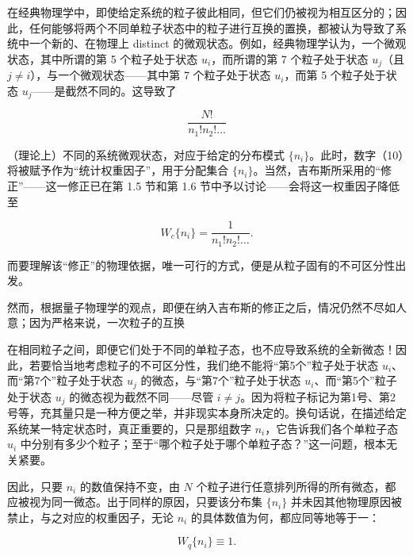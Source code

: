 在经典物理学中，即使给定系统的粒子彼此相同，但它们仍被视为相互区分的；因此，任何能够将两个不同单粒子状态中的粒子进行互换的置换，都被认为导致了系统中一个新的、在物理上 distinct 的微观状态。例如，经典物理学认为，一个微观状态，其中所谓的第 5 个粒子处于状态 \(u_i\)，而所谓的第 7 个粒子处于状态 \(u_j\)（且 \(j \neq i\)），与一个微观状态------其中第 7 个粒子处于状态 \(u_i\)，而第 5 个粒子处于状态 \(u_j\)------是截然不同的。这导致了

\begin{equation}\tag{5.4.9}\label{eq:5.4.9}
\frac { N ! } { n _ { 1 } ! n _ { 2 } ! \ldots }
\end{equation}

（理论上）不同的系统微观状态，对应于给定的分布模式 \(\{n_i\}\)。此时，数字（10）将被赋予作为``统计权重因子''，用于分配集合 \(\{n_i\}\)。当然，吉布斯所采用的``修正''------这一修正已在第 1.5 节和第 1.6 节中予以讨论------会将这一权重因子降低至

\begin{equation}\tag{5.4.10}\label{eq:5.4.10}
W _ { c } \{ n _ { i } \} = \frac { 1 } { n _ { 1 } ! n _ { 2 } ! \ldots } .
\end{equation}

而要理解该``修正''的物理依据，唯一可行的方式，便是从粒子固有的不可区分性出发。

然而，根据量子物理学的观点，即便在纳入吉布斯的修正之后，情况仍然不尽如人意；因为严格来说，一次粒子的互换

在相同粒子之间，即便它们处于不同的单粒子态，也不应导致系统的全新微态！因此，若要恰当地考虑粒子的不可区分性，我们绝不能将``第5个''粒子处于状态 \(u_i\)、而``第7个''粒子处于状态 \(u_j\) 的微态，与``第7个''粒子处于状态 \(u_i\)、而``第5个''粒子处于状态 \(u_j\) 的微态视为截然不同------尽管 \(i \neq j\)。因为将粒子标记为第1号、第2号等，充其量只是一种方便之举，并非现实本身所决定的。换句话说，在描述给定系统某一特定状态时，真正重要的，只是那组数字 \(n_i\)，它告诉我们各个单粒子态 \(u_i\) 中分别有多少个粒子；至于``哪个粒子处于哪个单粒子态？''这一问题，根本无关紧要。

因此，只要 \(n_i\) 的数值保持不变，由 \(N\) 个粒子进行任意排列所得的所有微态，都应被视为同一微态。出于同样的原因，只要该分布集 \(\{n_i\}\) 并未因其他物理原因被禁止，与之对应的权重因子，无论 \(n_i\) 的具体数值为何，都应同等地等于一：

\begin{equation}\tag{5.4.11}\label{eq:5.4.11}
W _ { q } \{ n _ { i } \} \equiv 1 .
\end{equation}

